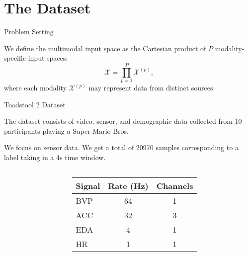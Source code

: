 \section{The Dataset}

\begin{frame}{Problem Setting}
	\begin{block}{}
		We define the multimodal input space as the Cartesian product of $P$ modality-specific input spaces:
		\[
		\mathcal{X} = \prod_{p=1}^{P} \mathcal{X}^{(p)},
		\]
		where each modality $\mathcal{X}^{(p)}$ may represent data from distinct sources.
	\end{block}
	
\end{frame}



\begin{frame}{Toadstool 2 Dataset}
\begin{block}{}
The dataset consists of video, sensor, and demographic data collected from 10 participants playing a Super Mario Bros.

	We focus on sensor data. We get a total of 20970 samples corresponding to a label taking in a 4s time window.
\end{block}
		\begin{columns}[T] %
		\begin{column}{0.5\textwidth}
			\begin{center}

			\end{center}
			
		\end{column}
		\begin{column}{0.5\textwidth}

		\centering
		\small
		\begin{tabular}{lcc}
		\toprule
		\textbf{Signal} & \textbf{Rate (Hz)} & \textbf{Channels} \\
		\midrule
		BVP  & 64 & 1      \\
		ACC  & 32 & 3 		\\
		EDA  & 4  & 1      \\
		HR   & 1  & 1      \\
		\bottomrule
		\end{tabular}
		



		\end{column}
	\end{columns}
\end{frame}


